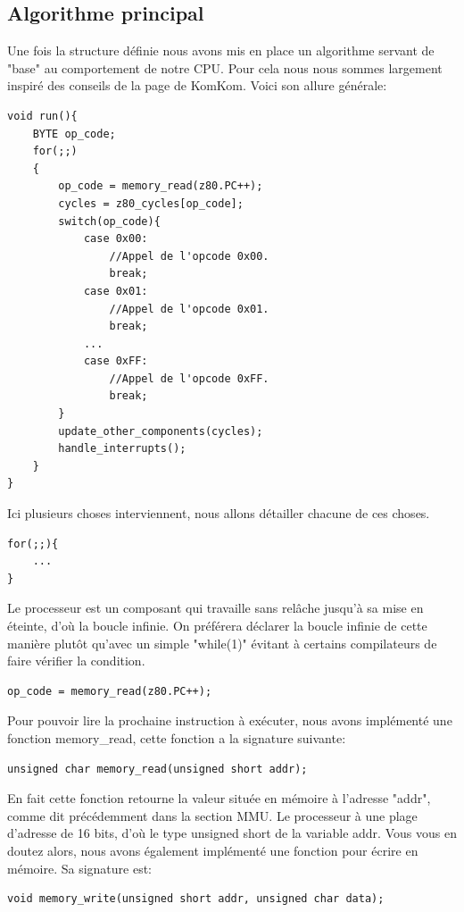 \documentclass{report}
\begin{document}
\subsection{Algorithme principal}
Une fois la structure définie nous avons mis en place un algorithme servant de "base" au comportement de notre CPU. Pour cela nous nous sommes largement inspiré des conseils de la page de KomKom\cite{komkom}. Voici son allure générale:
 \begin{lstlisting}
void run(){
	BYTE op_code;
	for(;;)
	{
		op_code = memory_read(z80.PC++);
		cycles = z80_cycles[op_code];
		switch(op_code){	
			case 0x00:
				//Appel de l'opcode 0x00.
				break;
			case 0x01:
				//Appel de l'opcode 0x01.
				break;
			...
			case 0xFF:
				//Appel de l'opcode 0xFF.
				break;
		}
		update_other_components(cycles);
		handle_interrupts();
	}
}
 \end{lstlisting}		
Ici plusieurs choses interviennent, nous allons détailler chacune de ces choses.
\begin{lstlisting}
for(;;){
	...
}
\end{lstlisting}
Le processeur est un composant qui travaille sans relâche jusqu'à sa mise en éteinte, d'où la boucle infinie. On préférera déclarer la boucle infinie de cette manière plutôt qu'avec un simple "while(1)" évitant à certains compilateurs de faire vérifier la condition.
\begin{lstlisting}
op_code = memory_read(z80.PC++);
\end{lstlisting}
Pour pouvoir lire la prochaine instruction à exécuter, nous avons implémenté une fonction memory\_read, cette fonction a la signature suivante:
\begin{lstlisting}
unsigned char memory_read(unsigned short addr);
\end{lstlisting}
En fait cette fonction retourne la valeur située en mémoire à l'adresse "addr", comme dit précédemment dans la section MMU. Le processeur à une plage d'adresse de 16 bits, d'où le type unsigned short de la variable addr.
Vous vous en doutez alors, nous avons également implémenté une fonction pour écrire en mémoire. Sa signature est:
\begin{lstlisting}
void memory_write(unsigned short addr, unsigned char data);
\end{lstlisting}
\end{document}
